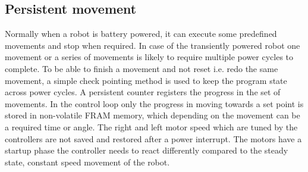 \subsection{Persistent movement}

Normally when a robot is battery powered, it can execute some predefined movements and stop when required.
In case of the transiently powered robot one movement or a series of movements is likely to require multiple power cycles to complete.
To be able to finish a movement and not reset i.e. redo the same movement, a simple check pointing method is used to keep the program state across power cycles.
A persistent counter registers the progress in the set of movements.
In the control loop only the progress in moving towards a set point is stored in non-volatile FRAM memory, which depending on the movement can be a required time or angle.
The right and left motor speed which are tuned by the controllers are not saved and restored after a power interrupt.
The motors have a startup phase the controller needs to react differently compared to the steady state, constant speed movement of the robot. 